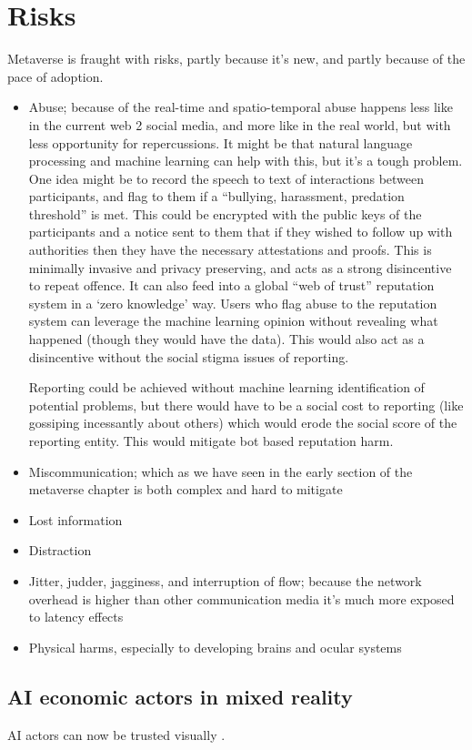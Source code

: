 \section{Risks}
Metaverse is fraught with risks, partly because it's new, and partly because of the pace of adoption.
\begin{itemize}
\item Abuse; because of the real-time and spatio-temporal abuse happens less like in the current web 2 social media, and more like in the real world, but with less opportunity for repercussions. It might be that natural language processing and machine learning can help with this, but it's a tough problem. One idea might be to record the speech to text of interactions between participants, and flag to them if a ``bullying, harassment, predation threshold'' is met. This could be encrypted with the public keys of the participants and a notice sent to them that if they wished to follow up with authorities then they have the necessary attestations and proofs. This is minimally invasive and privacy preserving, and acts as a strong disincentive to repeat offence. It can also feed into a global ``web of trust'' reputation system in a `zero knowledge' way. Users who flag abuse to the reputation system can leverage the machine learning opinion without revealing what happened (though they would have the data). This would also act as a disincentive without the social stigma issues of reporting.\par
Reporting could be achieved without machine learning identification of potential problems, but there would have to be a social cost to reporting (like gossiping incessantly about others) which would erode the social score of the reporting entity. This would mitigate bot based reputation harm.
\item Miscommunication; which as we have seen in the early section of the metaverse chapter is both complex and hard to mitigate
\item Lost information
\item Distraction
\item Jitter, judder, jagginess, and interruption of flow; because the network overhead is higher than other communication media it's much more exposed to latency effects 
\item Physical harms, especially to developing brains and ocular systems
\end{itemize}
\subsection{AI economic actors in mixed reality}
AI actors can now be trusted visually \cite{nightingale2022ai}.
